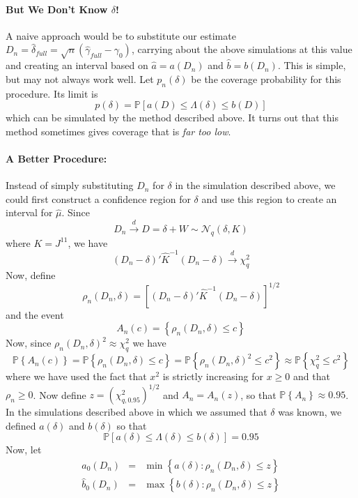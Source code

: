 \documentclass[12pt]{article}
\theoremstyle{definition}
\newcommand{\p}{\mathbb{P}}
\begin{document}
\paragraph{But We Don't Know $\delta$!} A naive approach would be to substitute our estimate $D_n = \hat{\delta}_{full} = \sqrt{n}(\hat{\gamma}_{full} - \gamma_0)$, carrying about the above simulations at this value and creating an interval based on $\hat{a} = a(D_n)$ and $\hat{b}=b(D_n)$. This is simple, but may not always work well. Let $p_n(\delta)$ be the coverage probability for this procedure. Its limit is
	$$p(\delta) = \p\left[a(D)\leq \Lambda(\delta) \leq b(D)  \right]$$
which can be simulated by the method described above. It turns out that this method sometimes gives coverage that is \emph{far too low}.

\paragraph{A Better Procedure:} Instead of simply substituting $D_n$ for $\delta$ in the simulation described above, we could first construct a confidence region for $\delta$ and use this region to create an interval for $\hat{\mu}$. Since 
	$$D_n \overset{d}{\rightarrow} D = \delta + W \sim \mathcal{N}_q\left(\delta,  K\right)$$
where $K = J^{11}$, we have
	$$\left(D_n - \delta\right)' \widehat{K}^{-1}\left(D_n - \delta\right) \overset{d}{\rightarrow} \chi^2_q$$
Now, define 
	$$\rho_n(D_n,\delta) =\left[\left(D_n - \delta\right)' \widehat{K}^{-1}\left(D_n - \delta\right)\right]^{1/2}$$
and the event
	$$A_n(c) = \left\{\rho_n(D_n,\delta) \leq c  \right\}$$
Now, since $\rho_n(D_n, \delta)^2 \approx \chi^2_q$ we have
		$$\p\left\{A_n(c)\right\}=\p\left\{\rho_n(D_n,\delta) \leq c  \right\} = \p\left\{\rho_n(D_n,\delta)^2 \leq c^2  \right\} \approx \p\left\{\chi^2_q \leq c^2  \right\} 
$$
where we have used the fact that $x^2$ is strictly increasing for $x\geq0$ and that $\rho_n \geq 0$. Now define $z = (\chi^2_{q,0.95})^{1/2}$ and $A_n = A_n(z)$, so that $\p\left\{A_n  \right\}\approx 0.95$. In the simulations described above in which we assumed that $\delta$ was known, we defined $a(\delta)$ and $b(\delta)$ so that
	$$\p\left[ a(\delta) \leq \Lambda(\delta) \leq b(\delta) \right]= 0.95$$
Now, let
	\begin{eqnarray*}
		\widehat{a}_0(D_n)&=& \min \left\{a(\delta)\colon \rho_n(D_n, \delta) \leq z\right\}\\
		\widehat{b}_0(D_n)&=& \max \left\{b(\delta)\colon \rho_n(D_n, \delta) \leq z\right\}
\end{eqnarray*}
\end{document}
